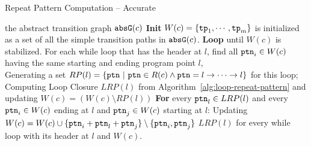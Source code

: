 \begin{algorithm}
  \caption{
{Repeat Pattern Computation -- Accurate}
\label{alg:repeat-pattern-complete}
}
\begin{algorithmic}[1]
\REQUIRE the abstract transition graph $\mathtt{abs}{\mathtt{G}}(c)$
\STATE  \textbf{Init} $W(c) = \{\mathtt{tp}_1, \cdots, \mathtt{tp}_m\}$ is initialized as a set of all the simple transition paths in $\mathtt{abs}{\mathtt{G}}(c)$.
\STATE  \textbf{Loop} until $W(c)$ is stabilized.
\STATE    \quad For each while loop that has the header at $l$, find all $\mathtt{ptn}_i \in W(c)$ having the same starting and ending program point $l$,
\\  \quad \quad Generating a set $RP(l) = \{\mathtt{ptn} ~|~ \mathtt{ptn} \in R(c) \land \mathtt{ptn} = l \to \cdots \to l\}$ for this loop;
\STATE    \quad \quad Computing Loop Closure $LRP(l)$ from Algorithm~\ref{alg:loop-repeat-pattern} and updating $W(c) = (W(c) \setminus RP(l))$
\STATE    \quad \quad \textbf{For} every $\mathtt{ptn}_l \in LRP(l)$ and every  $\mathtt{ptn}_i \in W(c)$ ending at $l$ and $\mathtt{ptn}_j \in W(c)$ starting at $l$:
\STATE  \quad \quad \quad  Updating $W(c) = W(c) \cup \{\mathtt{ptn}_i + \mathtt{ptn}_l + \mathtt{ptn}_j\} \setminus \{\mathtt{ptn}_i, \mathtt{ptn}_j\}$ 
\RETURN $LRP(l)$ for every while loop with its header at $l$ and $W(c)$.
\end{algorithmic}
\end{algorithm}
%
